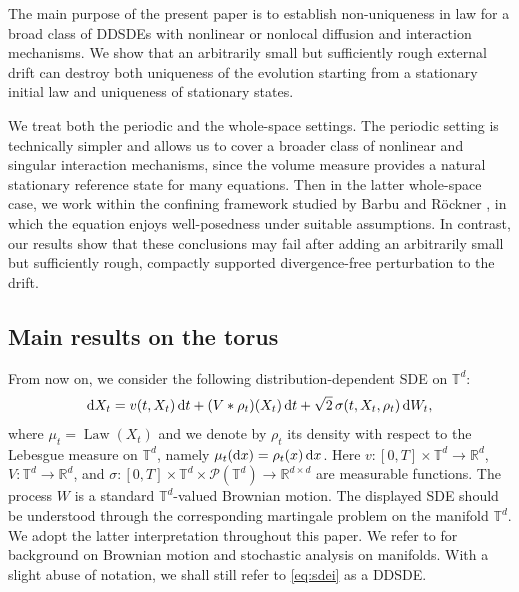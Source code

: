 \documentclass[UTF-8,reqno]{amsart}
\numberwithin{equation}{section}
\theoremstyle{definition}
\def\dif{{\mathord{{\rm d}}}}
\def\dif{{\mathord{{\rm d}}}}
\begin{document}
 
The main purpose of the present paper is to establish non-uniqueness in law
for a broad class of DDSDEs with nonlinear or nonlocal diffusion and
interaction mechanisms. We show that an arbitrarily small but sufficiently
rough external drift can destroy both uniqueness of the evolution starting
from a stationary initial law and uniqueness of stationary states.
 

We treat both the periodic and the whole-space settings. The periodic setting
is technically simpler and allows us to cover a broader class of nonlinear and
singular interaction mechanisms, since the   volume measure provides
a natural stationary reference state for many equations. Then in the latter whole-space case, we work within the confining framework studied by
Barbu and R\"ockner \cite{BR23}, in which the   equation enjoys
well-posedness under suitable assumptions. In   contrast, our results show
that these conclusions may fail after adding an arbitrarily small but
sufficiently rough, compactly supported divergence-free perturbation to the
drift.
 


\subsection{Main results on the torus}

From now on, we consider the following distribution-dependent SDE on
$\mathbb{T}^d$:
\begin{align}
    \dif X_t
    =
    v(t,X_t)\,\dif t
    +(V*\rho_t)(X_t)\,\dif t
    +\sqrt{2}\,\sigma(t,X_t,\rho_t)\,\dif W_t ,
    \label{eq:sdei}
\end{align}
where $\mu_t=\operatorname{Law}(X_t)$ and   we denote by $\rho_t$
its density with respect to the Lebesgue measure on $\mathbb{T}^d$, namely $\mu_t(\dif x)=\rho_t(x)\,\dif x$.  Here
$v:[0,T]\times\mathbb{T}^d\to\mathbb{R}^d$,
$V:\mathbb{T}^d\to\mathbb{R}^d$, and
$\sigma:[0,T]\times\mathbb{T}^d\times\mathcal P(\mathbb{T}^d)
\to \mathbb{R}^{d\times d}$ are measurable functions.  
The process $W$ is a standard $\mathbb{T}^d$-valued Brownian motion.
The displayed SDE should be understood  
through the corresponding martingale problem on the manifold $\mathbb{T}^d$.
We adopt the latter interpretation throughout this paper. We refer to
\cite{Hsu02} for background on Brownian motion and stochastic analysis on
manifolds. With a slight abuse of notation, we shall still refer to
\eqref{eq:sdei} as a DDSDE.
\end{document}
